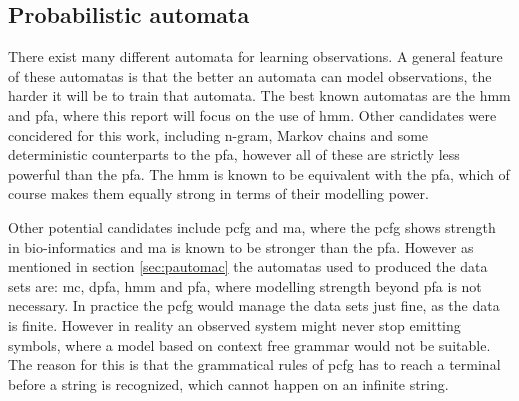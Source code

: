 \subsection{Probabilistic automata}
There exist many different automata for learning observations. A general feature of these automatas is that the better an automata can model observations, the harder it will be to train that automata. The best known automatas are the \gls{hmm} and \gls{pfa}, where this report will focus on the use of \gls{hmm}.\cite{pautomacTR}
Other candidates were concidered for this work, including n-gram, Markov chains and some deterministic counterparts to the \gls{pfa}, however all of these are strictly less powerful than the \gls{pfa}. The \gls{hmm} is known to be equivalent with the \gls{pfa}, which of course makes them equally strong in terms of their modelling power.

Other potential candidates include \gls{pcfg} and \gls{ma}, where the \gls{pcfg} shows strength in bio-informatics and \gls{ma} is known to be stronger than the \gls{pfa}. However as mentioned in section \ref{sec:pautomac} the automatas used to produced the data sets are: \gls{mc}, \gls{dpfa}, \gls{hmm} and \gls{pfa}, where modelling strength beyond \gls{pfa} is not necessary. In practice the \gls{pcfg} would manage the data sets just fine, as the data is finite. However in reality an observed system might never stop emitting symbols, where a model based on context free grammar would not be suitable. The reason for this is that the grammatical rules of \gls{pcfg} has to reach a terminal before a string is recognized, which cannot happen on an infinite string.